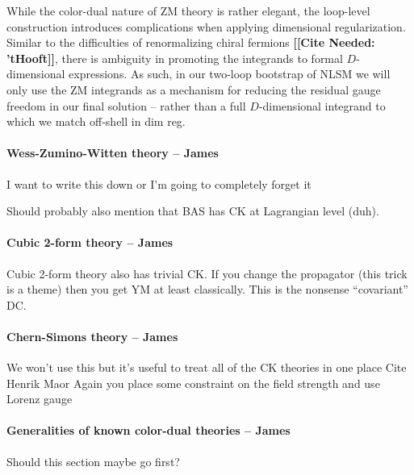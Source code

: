 \documentclass[11pt,letter]{article}
\newcommand{\citepls}[1]{{\bf\color{red}[[Cite Needed:#1]]}}
\begin{document}
While the color-dual nature of ZM theory is rather elegant, the loop-level construction introduces complications when applying dimensional regularization. Similar to the difficulties of renormalizing chiral fermions \citepls{ 'tHooft}, there is ambiguity in promoting the integrands to formal $D$-dimensional expressions. As such, in our two-loop bootstrap of NLSM we will only use the ZM integrands as a mechanism for reducing the residual gauge freedom in our final solution -- rather than a full $D$-dimensional integrand to which we match off-shell in dim reg. 

\paragraph{Wess-Zumino-Witten theory -- James}
I want to write this down or I'm going to completely forget it

Should probably also mention that BAS has CK at Lagrangian level (duh).

\paragraph{Cubic 2-form theory -- James}

Cubic 2-form theory also has trivial CK.
If you change the propagator (this trick is a theme) then you get YM at least classically.
This is the nonsense ``covariant'' DC.

\paragraph{Chern-Simons theory -- James}
We won't use this but it's useful to treat all of the CK theories in one place
Cite Henrik Maor
Again you place some constraint on the field strength and use Lorenz gauge

\paragraph{Generalities of known color-dual theories -- James}
Should this section maybe go first?
\end{document}
